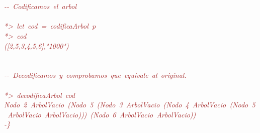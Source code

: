 \begin{allintypewriter}
\mbox{} \\
\mbox{} \\
\mbox{}\textit{\textcolor{Brown}{-\/-\ Codificamos\ el\ arbol}} \\
\mbox{} \\
\mbox{}\textit{\textcolor{Brown}{*\textgreater{}\ let\ cod\ =\ codificaArbol\ p}} \\
\mbox{}\textit{\textcolor{Brown}{*\textgreater{}\ cod}} \\
\mbox{}\textit{\textcolor{Brown}{([2,5,3,4,5,6],"{}1000"{})}} \\
\mbox{} \\
\mbox{} \\
\mbox{}\textit{\textcolor{Brown}{-\/-\ Decodificamos\ y\ comprobamos\ que\ equivale\ al\ original.}} \\
\mbox{} \\
\mbox{}\textit{\textcolor{Brown}{*\textgreater{}\ decodificaArbol\ cod}} \\
\mbox{}\textit{\textcolor{Brown}{Nodo\ 2\ ArbolVacio\ (Nodo\ 5\ (Nodo\ 3\ ArbolVacio\ (Nodo\ 4\ ArbolVacio\ (Nodo\ 5\ ArbolVacio\ ArbolVacio)))\ (Nodo\ 6\ ArbolVacio\ ArbolVacio))}} \\
\mbox{}\textit{\textcolor{Brown}{-\}}}

\end{allintypewriter}